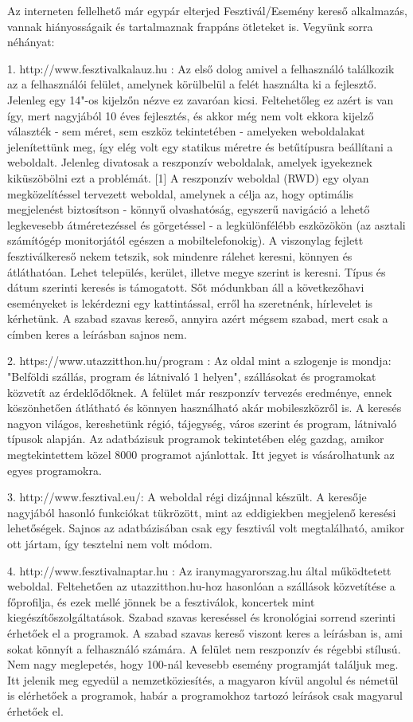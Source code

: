 \documentclass[11pt]{article}
\begin{document}
Az interneten fellelhető már egypár elterjed Fesztivál/Esemény kereső alkalmazás, vannak hiányosságaik és tartalmaznak frappáns ötleteket is. Vegyünk sorra néhányat:

1. http://www.fesztivalkalauz.hu : Az első dolog amivel a felhasználó találkozik az a felhasználói felület, amelynek körülbelül a felét használta ki a fejlesztő. Jelenleg egy 14"-os kijelzőn nézve ez zavaróan kicsi. Feltehetőleg ez azért is van így, mert nagyjából 10 éves fejlesztés, és akkor még nem volt ekkora kijelző választék - sem méret, sem eszköz tekintetében - amelyeken weboldalakat jelenítettünk meg, így elég volt egy statikus méretre és betűtípusra beállítani a weboldalt. Jelenleg divatosak a reszponzív weboldalak, amelyek igyekeznek kiküszöbölni ezt a problémát.
[1] A reszponzív weboldal (RWD) egy olyan megközelítéssel tervezett weboldal, amelynek a célja az, hogy optimális megjelenést biztosítson - könnyű olvashatóság, egyszerű navigáció a lehető legkevesebb átméretezéssel és görgetéssel - a legkülönfélébb eszközökön (az asztali számítógép monitorjától egészen a mobiltelefonokig).
A viszonylag fejlett fesztiválkereső nekem tetszik, sok mindenre rálehet keresni, könnyen és átláthatóan.
Lehet település, kerület, illetve megye szerint is keresni. Típus és dátum szerinti keresés is támogatott. Sőt módunkban áll a következőhavi eseményeket is lekérdezni egy kattintással, erről ha szeretnénk, hírlevelet is kérhetünk. A szabad szavas kereső, annyira azért mégsem szabad, mert csak a címben keres a leírásban sajnos nem.

2. https://www.utazzitthon.hu/program : Az oldal mint a szlogenje is mondja: "Belföldi szállás, program és látnivaló 1 helyen", szállásokat és programokat közvetít az érdeklődőknek. A felület már reszponzív tervezés eredménye, ennek köszönhetően átlátható és könnyen használható akár mobileszközről is. A keresés nagyon világos, kereshetünk régió, tájegység, város szerint és program, látnivaló típusok alapján. Az adatbázisuk programok tekintetében elég gazdag, amikor megtekintettem közel 8000 programot ajánlottak. Itt jegyet is vásárolhatunk az egyes programokra.

3. http://www.fesztival.eu/: A weboldal régi dizájnnal készült. A keresője nagyjából hasonló funkciókat tükrözött, mint az eddigiekben megjelenő keresési lehetőségek. Sajnos az adatbázisában csak egy fesztivál volt megtalálható, amikor ott jártam, így tesztelni nem volt módom.

4. http://www.fesztivalnaptar.hu : Az iranymagyarorszag.hu által működtetett weboldal. Feltehetően az utazzitthon.hu-hoz hasonlóan a szállások közvetítése a főprofilja, és ezek mellé jönnek be a fesztiválok, koncertek mint kiegészítőszolgáltatások. Szabad szavas kereséssel és kronológiai sorrend szerinti érhetőek el a programok. A szabad szavas kereső viszont keres a leírásban is, ami sokat könnyít a felhasználó számára. A felület nem reszponzív és régebbi stílusú. Nem nagy meglepetés, hogy 100-nál kevesebb esemény programját találjuk meg. Itt jelenik meg egyedül a nemzetköziesítés, a magyaron kívül angolul és németül is elérhetőek a programok, habár a programokhoz tartozó leírások csak magyarul érhetőek el.
\end{document}

